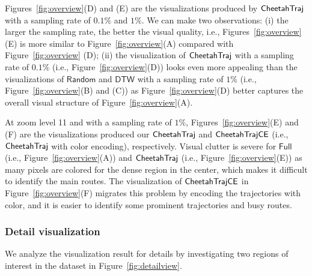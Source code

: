 Figures~\ref{fig:overview}(D) and (E) are the visualizations produced by $\mathsf{CheetahTraj}{}$ with a sampling rate of $0.1\%$ and $1\%$. We can make two observations: (i) the larger the sampling rate, the better the visual quality, i.e., Figures~\ref{fig:overview}(E) is more similar to Figure~\ref{fig:overview}(A) compared with Figure~\ref{fig:overview} (D); (ii) the visualization of $\mathsf{CheetahTraj}$ with a sampling rate of $0.1\%$ (i.e., Figure~\ref{fig:overview}(D)) looks even more appealing than the visualizations of $\mathsf{Random}$ and $\mathsf{DTW}$ with a sampling rate of $1\%$ (i.e., Figure~\ref{fig:overview}(B) and (C)) as Figure~\ref{fig:overview}(D) better captures the overall visual structure of Figure~\ref{fig:overview}(A).



 At zoom level 11 and with a sampling rate of $1\%$, Figures~\ref{fig:overview}(E) and (F) are the visualizations produced our $\mathsf{CheetahTraj}$ and $\mathsf{CheetahTraj}\mathsf{CE}$ (i.e., $\mathsf{CheetahTraj}$ with color encoding), respectively.
Visual clutter is severe for $\mathsf{Full}$ (i.e., Figure~\ref{fig:overview}(A)) and $\mathsf{CheetahTraj}$ (i.e., Figure~\ref{fig:overview}(E)) as many pixels are colored for the dense region in the center, which makes it difficult to identify the main routes. The visualization of $\mathsf{CheetahTraj}\mathsf{CE}$ in Figure~\ref{fig:overview}(F) migrates this problem by encoding the trajectories with color, and it is easier to identify some prominent trajectories and busy routes. 

\vspace{1mm}
\subsubsection{Detail visualization}\label{sec:detail}




We analyze the visualization result for details by investigating two regions of interest in the \pt{} dataset in Figure~\ref{fig:detailview}. 
 




